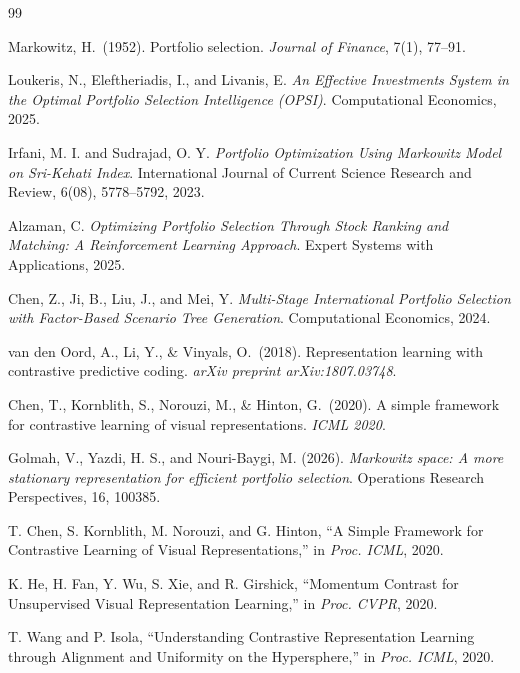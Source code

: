 \documentclass[preprint,12pt]{elsarticle}
\theoremstyle{plain}
\theoremstyle{definition}
\begin{document}
\begin{thebibliography}{99}

Markowitz, H.\ (1952).
Portfolio selection.
\textit{Journal of Finance}, 7(1), 77--91.

Loukeris, N., Eleftheriadis, I., and Livanis, E.  
\textit{An Effective Investments System in the Optimal Portfolio Selection Intelligence (OPSI)}.  
Computational Economics, 2025.

Irfani, M. I. and Sudrajad, O. Y.  
\textit{Portfolio Optimization Using Markowitz Model on Sri-Kehati Index}.  
International Journal of Current Science Research and Review, 6(08), 5778--5792, 2023.

Alzaman, C.  
\textit{Optimizing Portfolio Selection Through Stock Ranking and Matching: A Reinforcement Learning Approach}.  
Expert Systems with Applications, 2025.

Chen, Z., Ji, B., Liu, J., and Mei, Y.  
\textit{Multi-Stage International Portfolio Selection with Factor-Based Scenario Tree Generation}.  
Computational Economics, 2024.

van den Oord, A., Li, Y., \& Vinyals, O.\ (2018).
Representation learning with contrastive predictive coding.
\textit{arXiv preprint arXiv:1807.03748}.

Chen, T., Kornblith, S., Norouzi, M., \& Hinton, G.\ (2020).
A simple framework for contrastive learning of visual representations.
\textit{ICML 2020}.

Golmah, V., Yazdi, H. S., and Nouri-Baygi, M. (2026).
\textit{Markowitz space: A more stationary representation for efficient portfolio selection}.
Operations Research Perspectives, 16, 100385.

T. Chen, S. Kornblith, M. Norouzi, and G. Hinton,
``A Simple Framework for Contrastive Learning of Visual Representations,''
in \textit{Proc. ICML}, 2020.

K. He, H. Fan, Y. Wu, S. Xie, and R. Girshick,
``Momentum Contrast for Unsupervised Visual Representation Learning,''
in \textit{Proc. CVPR}, 2020.

T. Wang and P. Isola,
``Understanding Contrastive Representation Learning through Alignment and Uniformity on the Hypersphere,''
in \textit{Proc. ICML}, 2020.


\end{thebibliography}
\end{document}
